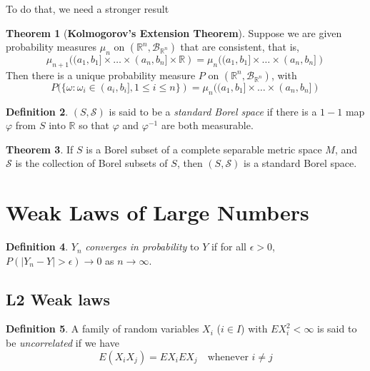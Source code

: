 \documentclass{article}
\theoremstyle{definition}
\newtheorem{theorem}{Theorem}[section]
\newtheorem{definition}[theorem]{Definition}
\begin{document}
To do that, we need a stronger result

\begin{theorem}[\textbf{Kolmogorov's Extension Theorem}]
    Suppose we are given probability measures $\mu_n$ on $(\mathbb{R}^n, \mathcal{B}_{\mathbb{R}^n})$ that are consistent, that is,
    $$ \mu_{n+1}((a_1, b_1] \times \dots \times (a_n, b_n] \times \mathbb{R}) = \mu_n((a_1, b_1] \times \dots \times (a_n, b_n])$$
    Then there is a unique probability measure $P$ on $(\mathbb{R}^n, \mathcal{B}_{\mathbb{R}^n})$, with
    $$ P( \{ \omega : \omega_i \in (a_i, b_i], 1 \leq i \leq n \}) = \mu_n((a_1, b_1] \times \dots \times (a_n, b_n])$$
\end{theorem}

\begin{definition}
    $(S, \mathcal{S})$ is said to be a \emph{standard Borel space} if there is a $1-1$ map $\varphi$ from $S$ into $\mathbb{R}$ so that $\varphi$ and $\varphi^{-1}$ are both measurable.
\end{definition}

\begin{theorem}
    If $S$ is a Borel subset of a complete separable metric space $M$, and $\mathcal{S}$ is the collection of Borel subsets of $S$, then $(S, \mathcal{S})$ is a standard Borel space.
\end{theorem}

\pagebreak

\section{Weak Laws of Large Numbers}

\begin{definition}
    $Y_n$ \emph{converges in probability} to $Y$ if for all $\epsilon > 0$, $P(|Y_n - Y| > \epsilon) \to 0$ as $n \to \infty$.
\end{definition}

\subsection{L2 Weak laws}

\begin{definition}

    A family of random variables $X_i$ ($i \in I$) with $EX_i^2 < \infty$ is said to be \emph{uncorrelated} if we have
    $$ E(X_i X_j) = EX_i EX_j \quad \text{whenever } i \neq j $$
\end{definition}
\end{document}
